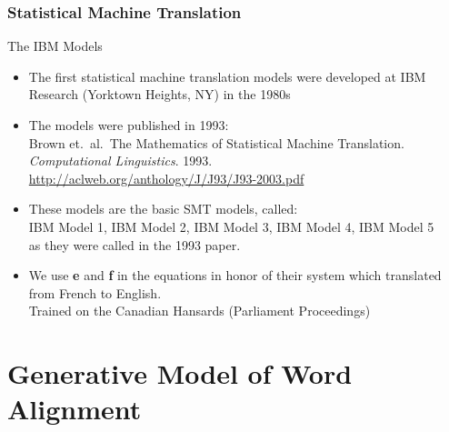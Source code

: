 \begin{frame}
\frametitle{Statistical Machine Translation}
\begin{block}{The IBM Models}
\begin{itemize}[<+->]
\item The first statistical machine translation models were developed at IBM Research (Yorktown Heights, NY) in the 1980s
\item The models were published in 1993: \\
{\small Brown et.\ al.\ The Mathematics of Statistical Machine Translation. \textit{Computational Linguistics}. 1993.} \\
{\small \url{http://aclweb.org/anthology/J/J93/J93-2003.pdf}}
\item These models are the basic SMT models, called: \\
IBM Model 1, IBM Model 2, IBM Model 3, IBM Model 4, IBM Model 5 \\
as they were called in the 1993 paper.
\item We use \textbf{e} and \textbf{f} in the equations in honor of their system which translated from French to English.\\
Trained on the Canadian Hansards (Parliament Proceedings)
\end{itemize}
\end{block}
\end{frame}


\section{Generative Model of Word Alignment}
\frame{\tableofcontents[currentsection]}

